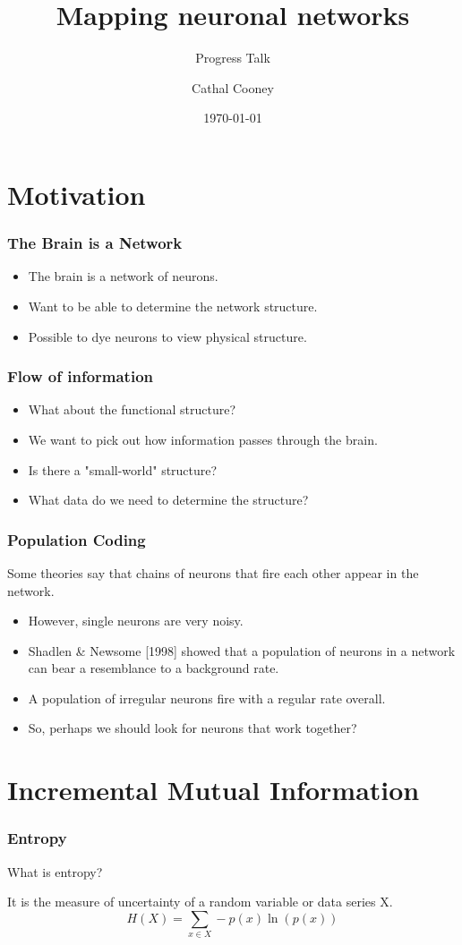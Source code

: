 \documentclass{beamer}
\title{Mapping neuronal networks}
\subtitle{Progress Talk}
\author{Cathal Cooney}
\institute{School of Maths, Trinity College Dublin}
\date{\today}
\begin{document}
\frame{\titlepage}

\section[Outline]{}
\frame{\tableofcontents}


\section{Motivation}
\frame
{
\frametitle{The Brain is a Network}
\begin{itemize}
\item The brain is a network of neurons.
\item Want to be able to determine the network structure.
\pause
\item Possible to dye neurons to view physical structure.
\end{itemize}
}

\frame
{
\frametitle{Flow of information}
\begin{itemize}
\item What about the functional structure?
\pause
\item We want to pick out how information passes through the brain.
\pause
\item Is there a "small-world" structure?
\pause
\item What data do we need to determine the structure?
\end{itemize}
}

\frame
{
\frametitle{Population Coding}
Some theories say that chains of neurons that fire each other appear in the network.
\pause
\begin{itemize}
\item However, single neurons are very noisy.
\pause
\item Shadlen \& Newsome [1998] showed that a population of neurons in a network can bear a resemblance to a background rate.
\item A population of irregular neurons fire with a regular rate overall.
\pause
\item So, perhaps we should look for neurons that work together?
\end{itemize}
}

\section{Incremental Mutual Information}

\frame
{
\frametitle{Entropy}
What is entropy?
\bigskip
\pause

It is the measure of uncertainty of a random variable or data series X.
$$
H(X) = \sum_{x \in X}  -p(x)\ln (p(x))
$$
}
\end{document}
